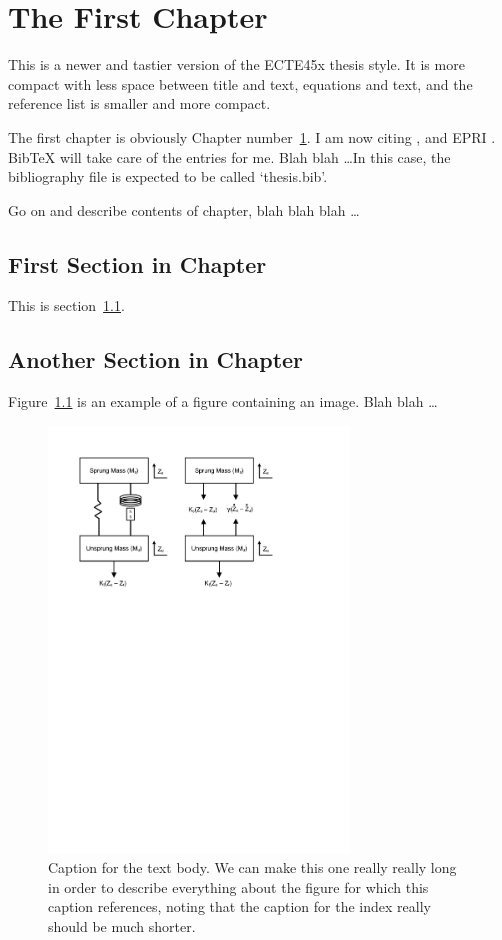 \chapter{The First Chapter}\label{chap:first}

This is a newer and tastier version of the ECTE45x thesis style. It is more
compact with less space between title and text, equations and text, and the
reference list is smaller and more compact. 

The first chapter is obviously Chapter number~\ref{chap:first}. I am now
citing \citet{Honsinger71a}, \citet{Jovanovic95a} and EPRI \citep{EPRI01}.
BibTeX will take care of the entries for me.  Blah blah \ldots In this case,
the bibliography file is expected to be called `thesis.bib'.

Go on and describe contents of chapter, blah blah blah \ldots

\section{First Section in Chapter}\label{first:sec}

This is section~\ref{first:sec}.

\section{Another Section in Chapter}

Figure~\ref{fig:example} is an example of a figure containing an image.
Blah blah \ldots

\begin{figure}[!h]
\begin{singlespace}
\centering
\includegraphics[width=8cm]{FBD.pdf}
\caption[Caption for the List of Figures.]{Caption for the text body. We can
make this one really really long in order to describe everything
about the figure for which this caption references, noting that
the caption for the index really should be much shorter.}
\label{fig:example}
\end{singlespace}
\end{figure}

